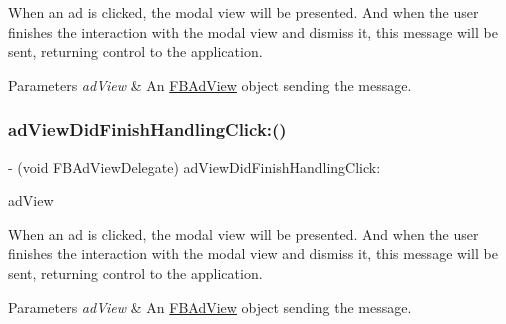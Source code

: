 When an ad is clicked, the modal view will be presented. And when the user finishes the interaction with the modal view and dismiss it, this message will be sent, returning control to the application.


\begin{DoxyParams}{Parameters}
{\em ad\+View} & An \hyperlink{interfaceFBAdView}{F\+B\+Ad\+View} object sending the message. \\
\hline
\end{DoxyParams}
\mbox{\label{protocolFBAdViewDelegate_01-p_a7fb041c26e7163226dfc7f2565c543b6}} 
\subsubsection{\texorpdfstring{ad\+View\+Did\+Finish\+Handling\+Click\+:()}{adViewDidFinishHandlingClick:()}\hspace{0.1cm}{\footnotesize\ttfamily [2/5]}}
{\footnotesize\ttfamily -\/ (void F\+B\+Ad\+View\+Delegate) ad\+View\+Did\+Finish\+Handling\+Click\+: \begin{DoxyParamCaption}\item[{(\hyperlink{interfaceFBAdView}{F\+B\+Ad\+View} $\ast$)}]{ad\+View }\end{DoxyParamCaption}\hspace{0.3cm}{\ttfamily [optional]}}

When an ad is clicked, the modal view will be presented. And when the user finishes the interaction with the modal view and dismiss it, this message will be sent, returning control to the application.


\begin{DoxyParams}{Parameters}
{\em ad\+View} & An \hyperlink{interfaceFBAdView}{F\+B\+Ad\+View} object sending the message. \\
\hline
\end{DoxyParams}
\mbox{\label{protocolFBAdViewDelegate_01-p_a7fb041c26e7163226dfc7f2565c543b6}} 
